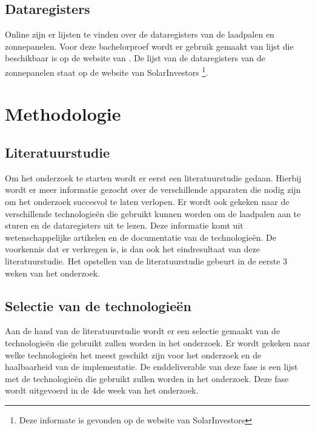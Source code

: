 \subsection{Dataregisters}%
\label{sub:dataregisters}
Online zijn er lijsten te vinden over de dataregisters van de laadpalen en zonnepanelen. Voor deze bachelorproef wordt er gebruik gemaakt van lijst die beschikbaar is op de website van \textcite{Alfen2020}. De lijst van de dataregisters van de zonnepanelen staat op de website van SolarInvestors \footnote{Deze informate is gevonden op de website van SolarInvestors}.


\section{Methodologie}%
\label{sec:methodologie}

\subsection{Literatuurstudie}%
\label{sub:literatuurstudie_methodologie}
Om het onderzoek te starten wordt er eerst een literatuurstudie gedaan. Hierbij wordt er meer informatie gezocht over de verschillende apparaten die nodig zijn om het onderzoek succesvol te laten verlopen. Er wordt ook gekeken naar de verschillende technologieën die gebruikt kunnen worden om de laadpalen aan te sturen en de dataregisters uit te lezen. Deze informatie komt uit wetenschappelijke artikelen en de documentatie van de technologieën. De voorkennis dat er verkregen is, is dan ook het eindresultaat van deze literatuurstudie. Het opstellen van de literatuurstudie gebeurt in de eerste 3 weken van het onderzoek.

\subsection{Selectie van de technologieën}%
\label{sub:selectie_van_de_technologieen}
Aan de hand van de literatuurstudie wordt er een selectie gemaakt van de technologieën die gebruikt zullen worden in het onderzoek. Er wordt gekeken naar welke technologieën het meest geschikt zijn voor het onderzoek en de haalbaarheid van de implementatie. De enddeliverable van deze fase is een lijst met de technologieën die gebruikt zullen worden in het onderzoek. Deze fase wordt uitgevoerd in de 4de week van het onderzoek.


